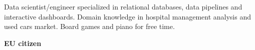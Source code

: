 

\begin{cvparagraph}
\begin{minipage}[t]{0.3\textwidth} %
Data scientist/engineer specialized in relational databases, data pipelines and
interactive dashboards. Domain knowledge in hospital management analysis and
used cars market. Board games and piano for free time.

\medskip
\textbf{EU citizen}

\end{minipage}
\hfill
\begin{minipage}[t]{0.6\textwidth} %

\end{minipage}
\end{cvparagraph}
